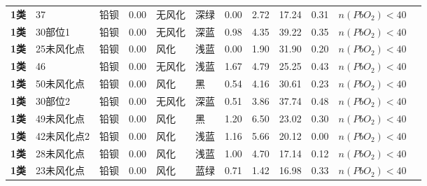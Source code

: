\documentclass[withoutpreface,bwprint]{cumcmthesis} %
\begin{document}
\begin{appendices}
\begin{table}[!h]
\begin{tabular}{@{}llllllllllll@{}}
			\textbf{1类} & 37             & 铅钡          & 0.00      & 无风化           & 深绿          & 0.00              & 2.72                & 17.24             & 0.31              & $n(PbO_2)<40$                          &           \\
			\textbf{1类} & 30部位1          & 铅钡          & 0.00      & 无风化           & 深蓝          & 0.98              & 4.35                & 39.22             & 0.35              & $n(PbO_2)<40$                          &           \\
			\textbf{1类} & 25未风化点         & 铅钡          & 0.00      & 风化            & 浅蓝          & 0.00              & 1.90                & 31.90             & 0.20              & $n(PbO_2)<40$                          &           \\
			\textbf{1类} & 46             & 铅钡          & 0.00      & 无风化           & 浅蓝          & 1.67              & 4.79                & 25.25             & 0.43              & $n(PbO_2)<40$                          &           \\
			\textbf{1类} & 50未风化点         & 铅钡          & 0.00      & 风化            & 黑           & 0.54              & 4.16                & 30.61             & 0.23              & $n(PbO_2)<40$                          &           \\
			\textbf{1类} & 30部位2          & 铅钡          & 0.00      & 无风化           & 深蓝          & 0.51              & 3.86                & 37.74             & 0.48              & $n(PbO_2)<40$                          &           \\
			\textbf{1类} & 49未风化点         & 铅钡          & 0.00      & 风化            & 黑           & 1.20              & 6.50                & 23.02             & 0.30              & $n(PbO_2)<40$                          &           \\
			\textbf{1类} & 42未风化点2        & 铅钡          & 0.00      & 风化            & 浅蓝          & 1.16              & 5.66                & 20.12             & 0.00              & $n(PbO_2)<40$                          &           \\
			\textbf{1类} & 28未风化点         & 铅钡          & 0.00      & 风化            & 浅蓝          & 1.00              & 4.70                & 17.14             & 0.12              & $n(PbO_2)<40$                          &           \\
			\textbf{1类} & 23未风化点         & 铅钡          & 0.00      & 风化            & 蓝绿          & 0.71              & 1.42                & 16.98             & 0.33              & $n(PbO_2)<40$                          &           \\

\end{tabular}
\end{table}
\end{appendices}
\end{document}
